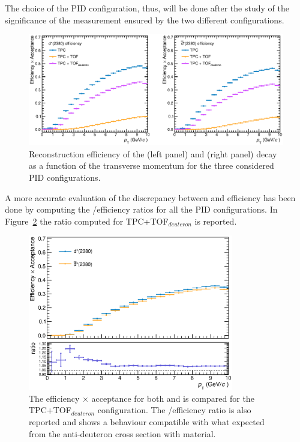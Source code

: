 The choice of the PID configuration, thus, will be done after the study of the significance of the measurement ensured by the two different configurations.

\begin{figure}
    \centering
    \includegraphics[width=\textwidth]{gfx/eff3globalSLIM}
	\caption{Reconstruction efficiency of the \ds (left panel) and \dsbar (right panel) decay as a function of the transverse momentum for the three considered PID configurations.}
	\label{fig:effAM}
\end{figure}

A more accurate evaluation of the discrepancy between \ds and \dsbar efficiency has been done
by computing the \ds/\dsbar efficiency ratios for all the PID configurations.
In Figure~\ref{fig:eff_ratioAM} the ratio computed for TPC+TOF$_{deuteron}$ is reported.

\begin{figure} [!h]
    \centering
    \includegraphics[width=0.8\textwidth]{gfx/eff_ratioAM1SLIM}
	\caption{The efficiency $\times$ acceptance for both \ds and \dsbar is compared for the TPC+TOF$_{deuteron}$ configuration. The \ds/\dsbar efficiency ratio is also reported and shows a behaviour compatible with what expected from the anti-deuteron cross section with material.}
	\label{fig:eff_ratioAM}
\end{figure}

